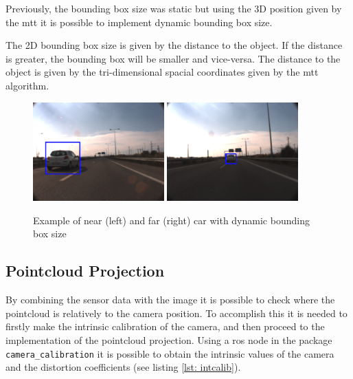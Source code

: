Previously, the bounding box size was static but using the 3D position given by the \gls{mtt} it is possible to implement dynamic bounding box size.

The 2D bounding box size is given by the distance to the object. If the distance is greater, the bounding box will be smaller and vice-versa. The distance to the object is given by the tri-dimensional spacial coordinates given by the \gls{mtt} algorithm.

\begin{figure}[htp]
	
	\centering
	\includegraphics[width=0.45\textwidth]{caplabel/imgs/boxds1.png}
	\includegraphics[width=0.45\textwidth]{caplabel/imgs/boxds2.png}
	
	\caption{Example of near (left) and far (right) car with dynamic bounding box size}
	\label{fig:basket}
	
\end{figure}

\subsection{Pointcloud Projection}

By combining the sensor data with the image it is possible to check where the pointcloud is relatively to the camera position. To accomplish this it is needed to firstly make the intrinsic calibration of the camera, and then proceed to the implementation of the pointcloud projection. Using a \gls{ros} node in the package \texttt{camera\_calibration} it is possible to obtain the intrinsic values of the camera and the distortion coefficients (see listing \ref{lst: intcalib}).

